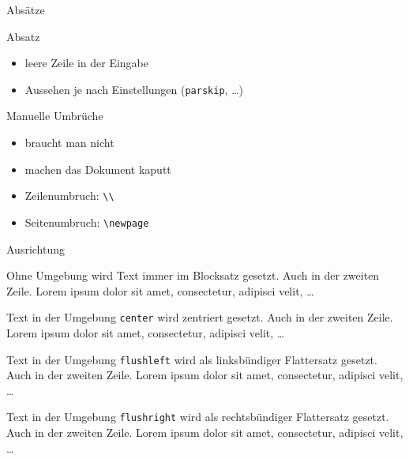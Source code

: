 \begin{Frame}[fragile]{Absätze}
  \begin{Block}{Absatz}
    \begin{itemize}
      \item leere Zeile in der Eingabe
      \item Aussehen je nach Einstellungen (\lstinline-parskip-, \ldots)
    \end{itemize}
  \end{Block}

  \begin{Block}{Manuelle Umbrüche}
    \begin{itemize}
      \item braucht man nicht
      \item machen das Dokument kaputt
      \item Zeilenumbruch: \lstinline-\\-
      \item Seitenumbruch: \lstinline-\newpage-
    \end{itemize}
  \end{Block}
\end{Frame}

\begin{Frame}[fragile]{Ausrichtung}
  \newcommand{\lorem}{\textcolor{black!40}{Auch in der zweiten Zeile. Lorem ipsum dolor sit amet, consectetur, adipisci velit, \ldots}}

  \begin{minipage}{\textwidth}
    Ohne Umgebung wird Text immer im \alert{Blocksatz} gesetzt.
    \lorem
  \end{minipage}

  \xxx

  \begin{center}
    Text in der Umgebung \lstinline-center- wird \alert{zentriert}
    gesetzt.
    \lorem
  \end{center}

  \xxx

  \begin{flushleft}
    Text in der Umgebung \lstinline-flushleft- wird als
    \alert{linksbündiger Flattersatz} gesetzt.
    \lorem
  \end{flushleft}

  \xxx

  \begin{flushright}
    Text in der Umgebung \lstinline-flushright- wird als
    \alert{rechtsbündiger Flattersatz} gesetzt.
    \lorem
  \end{flushright}
\end{Frame}

